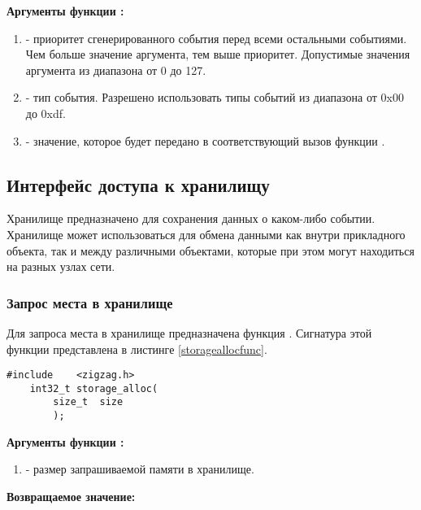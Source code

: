 {\bfseries Аргументы функции :}

{\itshape
\begin{enumerate}
\item {} - приоритет сгенерированного события перед всеми остальными событиями. Чем больше значение аргумента, тем выше
приоритет. Допустимые значения аргумента из диапазона от 0 до 127.
\item {} - тип события. Разрешено использовать типы событий из диапазона от 0x00 до 0xdf.
\item {} - значение, которое будет передано в соответствующий вызов функции .
\end{enumerate}
}

\subsection{Интерфейс доступа к хранилищу}
Хранилище предназначено для сохранения данных о каком-либо событии. Хранилище может использоваться для
обмена данными как внутри прикладного объекта, так и между различными объектами, которые при этом могут находиться
на разных узлах сети. 

\subsubsection{Запрос места в хранилище}

Для запроса места в хранилище предназначена функция . Сигнатура этой функции 
представлена в листинге \ref{storageallocfunc}.

\begin{lstlisting}[caption=Функция \myfunc{storage\_alloc()} - запрос места в хранилище, label=storageallocfunc]
    #include    <zigzag.h>
    int32_t storage_alloc(
        size_t  size
        );
\end{lstlisting}

{\bfseries Аргументы функции :}

{\itshape
\begin{enumerate} 
\item {} - размер запрашиваемой памяти в хранилище.
\end{enumerate}
}

{\bfseries Возвращаемое значение:}

